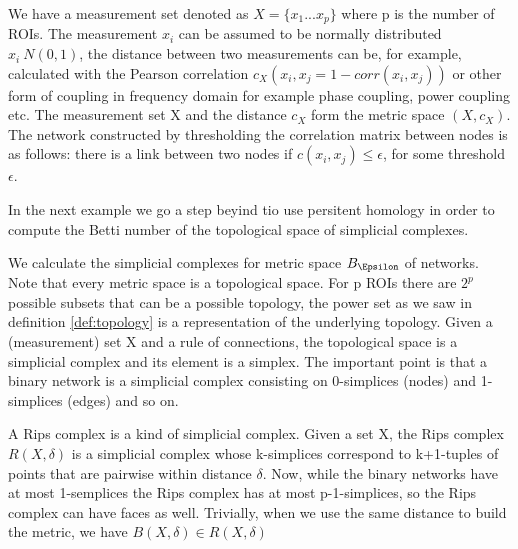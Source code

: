 \documentclass[onecollarge,runningheads]{svjour2}
\begin{document}
\begin{example}

We have a measurement set denoted as $X= \{ x_1 ... x_p\}$ where p is the number of ROIs. The measurement $x_i$ can be assumed to be normally distributed $x_i ~ N(0,1)$, the distance between two measurements can be, for example, calculated with the Pearson correlation $c_{X}(x_i,x_j= 1 - corr(x_i,x_j))$ or other form of coupling in frequency domain for example phase coupling, power coupling etc. 
The measurement set X and the distance $c_X$ form the metric space $(X,c_X)$. The network constructed by thresholding the correlation matrix between nodes is as follows:
there is a link between two nodes if $c(x_i,x_j) \leq \epsilon$, for some threshold $\epsilon$.
\end{example}

In the next example we go a step beyind tio use persitent homology in order to compute the Betti number of the topological space of simplicial complexes. 

\begin{example}
We calculate the simplicial complexes for metric space $B_\Epsilon$ of networks. Note that  every metric space is a topological space. 
For p ROIs there are $2^p$ possible subsets that can be a possible topology, the power set as we saw in definition \ref{def:topology} is a representation of the underlying topology.
Given a (measurement) set X and a rule of connections, the topological space is a simplicial complex and its element is a simplex. %
The important point is that a binary network is a simplicial complex consisting on 0-simplices (nodes) and 1-simplices (edges) and so on.

A Rips complex is a kind of simplicial complex. Given a set X, the Rips complex $R(X,\delta)$ is a simplicial complex whose k-simplices correspond to k+1-tuples of points that are pairwise within distance $\delta$. 
Now, while the binary networks have at most 1-semplices the Rips complex has at most p-1-simplices, so the Rips complex can have faces as well. Trivially, when we use the same distance to build the metric, we have $B(X,\delta) \in R(X,\delta)$
\end{example}
\end{document}
